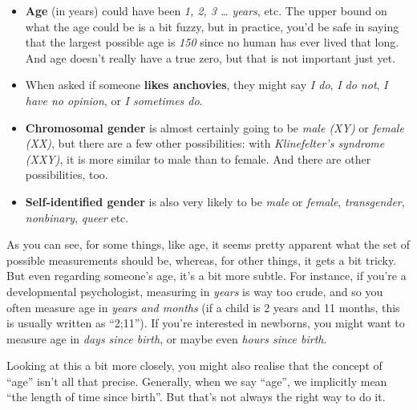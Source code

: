 \documentclass[
  11pt,
  a4paper,
  twoside,symmetric,openright]{book}
\providecommand{\tightlist}{%
  \setlength{\itemsep}{0pt}\setlength{\parskip}{0pt}}
\theoremstyle{break}
\theoremstyle{break}
\begin{document}
\begin{itemize}
\tightlist
\item
  \textbf{Age} (in years) could have been \emph{1, 2, 3 \ldots{} years}, etc. The upper bound on what the age could be is a bit fuzzy, but in practice, you'd be safe in saying that the largest possible age is \emph{150} since no human has ever lived that long. And age doesn't really have a true zero, but that is not important just yet.
\item
  When asked if someone \textbf{likes anchovies}, they might say \emph{I do}, \emph{I do not}, \emph{I have no opinion}, or \emph{I sometimes do}.
\item
  \textbf{Chromosomal gender} is almost certainly going to be \emph{male (XY)} or \emph{female (XX)}, but there are a few other possibilities: with \emph{Klinefelter's syndrome (XXY)}, it is more similar to male than to female. And there are other possibilities, too.
\item
  \textbf{Self-identified gender} is also very likely to be \emph{male} or \emph{female}, \emph{transgender}, \emph{nonbinary}, \emph{queer} etc.
\end{itemize}

As you can see, for some things, like age, it seems pretty apparent what the set of possible measurements should be, whereas, for other things, it gets a bit tricky. But even regarding someone's age, it's a bit more subtle. For instance, if you're a developmental psychologist, measuring in \emph{years} is way too crude, and so you often measure age in \emph{years and months} (if a child is 2 years and 11 months, this is usually written as ``2;11''). If you're interested in newborns, you might want to measure age in \emph{days since birth}, or maybe even \emph{hours since birth}.

Looking at this a bit more closely, you might also realise that the concept of ``age'' isn't all that precise. Generally, when we say ``age'', we implicitly mean ``the length of time since birth''. But that's not always the right way to do it.
\end{document}
